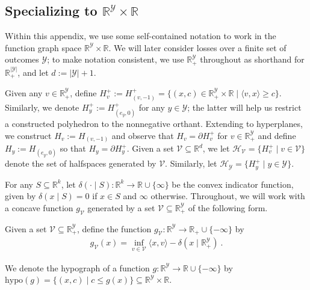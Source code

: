 \documentclass[twoside,11pt]{article}
\newcommand{\reals}{\mathbb{R}}
\renewcommand{\H}{\mathcal{H}}
\newcommand{\V}{\mathcal{V}}
\newcommand{\Y}{\mathcal{Y}}
\newcommand{\inprod}[2]{\langle #1, #2 \rangle}%
\newcommand{\hyp}{\mathrm{hypo}}
\begin{document}
\subsection{Specializing to $\reals^\Y \times \reals$}\label{appsubsec:notation}
Within this appendix, we use some self-contained notation to work in the function graph space $\reals^\Y \times \reals$.
We will later consider losses over a finite set of outcomes $\Y$; to make notation consistent, we use $\reals^\Y_+$ throughout as shorthand for $\reals^{|\Y|}_+$, and let $d := |\Y|+1$.

Given any $v \in \reals^\Y_+$, define $H^+_v := H^+_{(v, -1)} = \{(x, c) \in \reals^{\Y}_+ \times \reals \mid \inprod{v}{x} \geq c\}$.
Similarly, we denote $H_y^+ := H_{(e_y, 0)}^+$ for any $y \in \Y$; the latter will help us restrict a constructed polyhedron to the nonnegative orthant. 
Extending to hyperplanes, we construct $H_v := H_{(v,-1)}$ and observe that $H_v = \partial H^+_v$ for $v \in \reals^\Y_+$ and define $H_y := H_{(e_y, 0)}$ so that $H_y = \partial H^+_y$.
Given a set $\V \subseteq \reals^d$, we let $\H_{\V} = \{H_v^+ \mid v\in\V\}$ denote the set of halfspaces generated by $\V$.
Similarly, let $\H_\Y = \{H_y^+ \mid y\in\Y\}$.


For any $S \subseteq \reals^k$, let $\delta(\cdot \mid S):\reals^k \to \reals \cup \{\infty\}$ be the convex indicator function, given by $\delta(x \mid S) = 0$ if $x\in S$ and $\infty$ otherwise.
Throughout, we will work with a concave function $g_\V$ generated by a set $\V \subseteq \reals^\Y_+$ of the following form.

\begin{definition}\label{def:g-finite}
  Given a set $\V \subseteq \reals^\Y_+$, define the function $g_\V : \reals^\Y \to \reals_+ \cup \{-\infty\}$ by
  \begin{align*}
    g_\V(x) = \inf_{v\in\V} \inprod{x}{v} - \delta(x \mid \reals_+^\Y)~. %
  \end{align*}
\end{definition}
\noindent
We denote the hypograph of a function $g:\reals^\Y\to\reals\cup\{-\infty\}$ by $\hyp(g) = \{(x,c) \mid c \leq g(x)\} \subseteq \reals^\Y \times \reals$.
\end{document}
